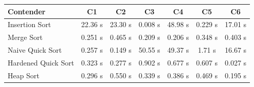 \documentclass[10pt,a4paper]{article}
\begin{document}
\begin{minipage}[t]{0.485\linewidth}\vspace{0pt}
{\fontsize{6.2}{7.4}\selectfont
\renewcommand{\arraystretch}{1.10}
\begin{tabularx}{\linewidth}{@{}L{2.35}C{0.775}C{0.775}C{0.775}C{0.775}C{0.775}C{0.775}@{}}
\toprule{}
\textbf{Contender} & \textbf{C1} & \textbf{C2} & \textbf{C3} & \textbf{C4} & \textbf{C5} & \textbf{C6} \\
\midrule
Insertion Sort & 22.36 s & 23.30 s & 0.008 s & 48.98 s & 0.229 s & 17.01 s \\
Merge Sort & 0.251 s & 0.465 s & 0.209 s & 0.206 s & 0.348 s & 0.403 s \\
Naive Quick Sort & 0.257 s & 0.149 s & 50.55 s & 49.37 s & 1.71 s & 16.67 s \\
Hardened Quick Sort & 0.323 s & 0.277 s & 0.902 s & 0.677 s & 0.607 s & 0.027 s \\
Heap Sort & 0.296 s & 0.550 s & 0.339 s & 0.386 s & 0.469 s & 0.195 s \\
\bottomrule
\end{tabularx}}
\end{minipage}
\hfill
\end{document}
